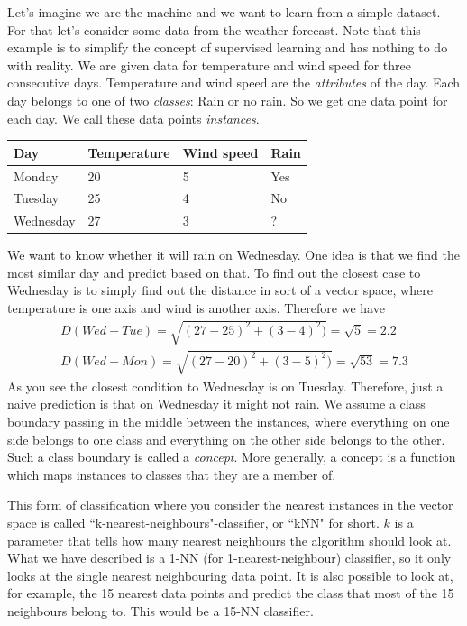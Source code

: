 \documentclass[10pt,a4paper]{article}
\begin{document}
Let's imagine we are the machine and we want to learn from a simple dataset.
For that let's consider some data from the weather forecast. Note that this example is to simplify the concept of supervised learning and has nothing to do with reality.
We are given data for temperature and wind speed for three consecutive days. Temperature and wind speed are the \textit{attributes} of the day. Each day belongs to one of two \textit{classes}: Rain or no rain. So we get one data point for each day. We call these data points \textit{instances}.


\begin{longtable}{|l|l|l|l|}
\hline
Day & Temperature & Wind speed & Rain \\ \hline

 Monday& 20 &5&Yes  \\ \hline
Tuesday & 25 & 4 &No\\ \hline
Wednesday &27  & 3&? \\ \hline
\end{longtable}
We want to know whether it will rain on Wednesday. One idea is that we find the most similar day and predict based on that. To find out the closest case to Wednesday is to simply find out the distance in sort of a vector space, where temperature is one axis and wind is another axis.
Therefore we have
\begin{align}\nonumber
D(Wed-Tue)=\sqrt{(27-25)^2+(3-4)^2)}=\sqrt{5}=2.2\\
D(Wed-Mon)=\sqrt{(27-20)^2+(3-5)^2)}=\sqrt{53}=7.3
\end{align}
As you see the closest condition to Wednesday is on Tuesday. Therefore, just a naive prediction is that on Wednesday it might not rain. We assume a class boundary passing in the middle between the instances, where everything on one side belongs to one class and everything on the other side belongs to the other. Such a class boundary is called a \textit{concept}. More generally, a concept is a function which maps instances to classes that they are a member of. 

This form of classification where you consider the nearest instances in the vector space is called ``k-nearest-neighbours"-classifier, or ``kNN" for short. $k$ is a parameter that tells how many nearest neighbours the algorithm should look at. What we have described is a 1-NN (for 1-nearest-neighbour) classifier, so it only looks at the single nearest neighbouring data point. It is also possible to look at, for example, the 15 nearest data points and predict the class that most of the 15 neighbours belong to. This would be a 15-NN classifier.
\end{document}
